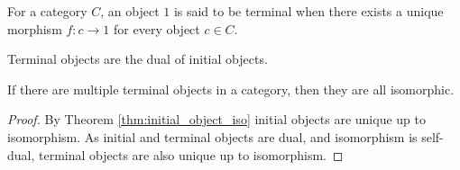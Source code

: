 \begin{definition}
  For a category $C$, an object $1$ is said to be terminal when there exists a
  unique morphism $f: c\to 1$ for every object $c\in C$.
  \parencite{awodey:category_theory}
\end{definition}

\begin{remark}
  Terminal objects are the dual of initial objects.
\end{remark}

\begin{theorem}\label{thm:terminal_object_iso}
  If there are multiple terminal objects in a category, then they are all
  isomorphic.

  \begin{proof}
    By Theorem \ref{thm:initial_object_iso} initial objects are unique up to
    isomorphism. As initial and terminal objects are dual, and isomorphism is self-dual, terminal objects are also unique up to isomorphism.
  \end{proof}
\end{theorem}

